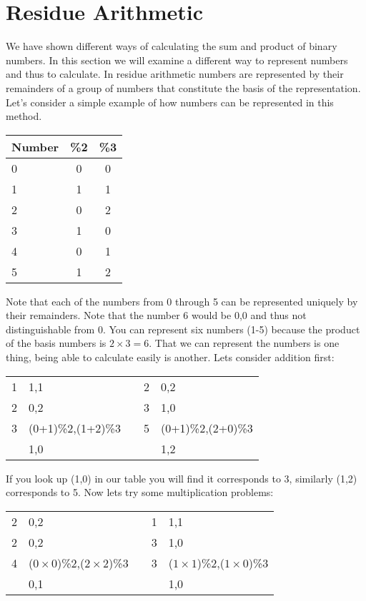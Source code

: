 \chapter{Residue Arithmetic}

We have shown different ways of calculating the sum and product of binary numbers.  In this section we will examine a different way to represent numbers and thus to calculate.  In residue arithmetic numbers are represented by their remainders of a group of numbers that constitute the basis of the representation.   Let's consider a simple example of how numbers can be represented in this method.

\begin{tabular}{|l|cc|} \hline
  Number & \%2 & \%3 \\ \hline
  0      & 0   & 0   \\
  1      & 1   & 1   \\ \hline
  2      & 0   & 2   \\
  3      & 1   & 0   \\ \hline
  4      & 0   & 1   \\
  5      & 1   & 2   \\ \hline
\end{tabular}

Note that each of the numbers from 0 through 5 can be represented uniquely by their remainders.  Note that the number 6 would be 0,0 and thus not distinguishable from 0.  You can represent six numbers (1-5) because the product of the basis numbers is $2\times 3=6$.  That we can represent the numbers is one thing, being able to calculate easily is another.  Lets consider addition first:

\begin{tabular}{r@{=}lcr@{=}l}
1 & 1,1               && 2 & 0,2 \\
2 & 0,2               && 3 & 1,0 \\ \cline{1-2}\cline{4-5}
3 & (0+1)\%2,(1+2)\%3 && 5 & (0+1)\%2,(2+0)\%3 \\
  & 1,0               &&   & 1,2 \\
\end{tabular}

If you look up (1,0) in our table you will find it corresponds to 3, similarly (1,2) corresponds to 5.  Now lets try some multiplication problems:

\begin{tabular}{r@{=}lcr@{=}l}
2 & 0,2                               && 1 & 1,1 \\
2 & 0,2                               && 3 & 1,0 \\ \cline{1-2}\cline{4-5}
4 & ($0\times 0$)\%2,($2\times 2$)\%3 && 3 & ($1\times 1$)\%2,($1\times 0$)\%3 \\
  & 0,1                               &&   & 1,0 \\
\end{tabular}

